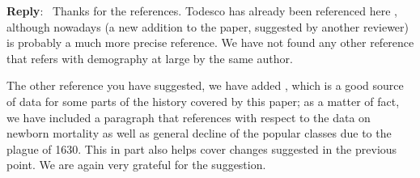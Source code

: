 \documentclass[11pt]{article}
\newcounter{reviewer}
\newcounter{point}[reviewer]
\newenvironment{reply}
   {\medskip \noindent \begin{sf}\textbf{Reply}:\  }
   {\medskip \end{sf}}
\begin{document}
\begin{reply}
  Thanks for the references. Todesco has already been referenced here
  \cite{todesco1989andamento}, although nowadays \cite{raines2003cooptazione} (a
  new addition to the paper, suggested by another reviewer) is probably a much
  more precise reference. We have not found any other reference that refers with
  demography at large by the same author.

  The other reference you have suggested, we have added
  \cite{beltrami1951composizione}, which is a good source of data for some parts
  of the history covered by this paper; as a matter of fact, we have included a
  paragraph that references with respect to the data on newborn mortality as
  well as general decline of the popular classes due to the plague of 1630. This
  in part also helps cover changes suggested in the previous point. We are again
  very grateful for the suggestion.
\end{reply}




\end{document}

